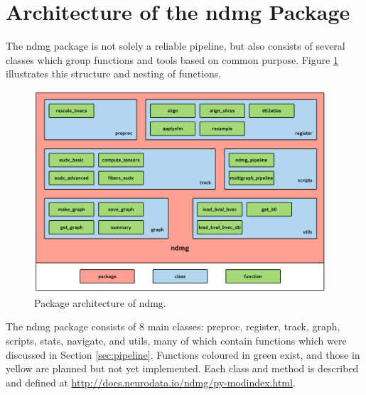 \section{Architecture of the ndmg Package}
\label{sec:arch}
The ndmg package is not solely a reliable pipeline, but also consists of several classes which group functions and tools based on common purpose. Figure \ref{fig:ndmg-architecture} illustrates this structure and nesting of functions.
\begin{figure}[h!]
\centering
\includegraphics[width=0.97\textwidth]{./figs/ndmg_architecture_pastel.png}
\makeatletter
\let\@currsize\normalsize
\caption{Package architecture of ndmg.}
\label{fig:ndmg-architecture}
\end{figure}
The ndmg package consists of 8 main classes: preproc, register, track, graph, scripts, stats, navigate, and utils, many of which contain functions which were discussed in Section \ref{sec:pipeline}. Functions coloured in green exist, and those in yellow are planned but not yet implemented. Each class and method is described and defined at \url{http://docs.neurodata.io/ndmg/py-modindex.html}.

